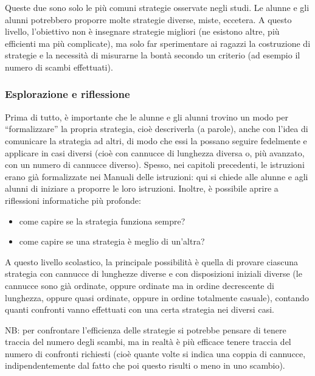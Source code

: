 Queste due sono solo le più comuni strategie osservate negli studi. Le alunne e gli alunni potrebbero proporre molte strategie diverse, miste, eccetera. A questo livello, l'obiettivo non è insegnare strategie migliori (ne esistono altre, più efficienti ma più complicate), ma solo far sperimentare ai ragazzi la costruzione di strategie e la necessità di misurarne la bontà secondo un criterio (ad esempio il numero di scambi effettuati).

\subsubsection{Esplorazione e riflessione}\label{esplorazione-e-riflessione}

Prima di tutto, è importante che le alunne e gli alunni trovino un modo per ``formalizzare'' la propria strategia, cioè descriverla (a parole), anche con l'idea di comunicare la strategia ad altri, di modo che essi la possano seguire fedelmente e applicare in casi diversi (cioè con cannucce di lunghezza diversa o, più avanzato, con un numero di cannucce diverso). Spesso, nei capitoli precedenti, le istruzioni erano già formalizzate nei Manuali delle istruzioni: qui si chiede alle alunne e agli alunni di iniziare a proporre le loro istruzioni. Inoltre, è possibile aprire a riflessioni informatiche più profonde:

\begin{itemize}
\item
  come capire se la strategia funziona sempre?
\item
  come capire se una strategia è meglio di un'altra?
\end{itemize}

A questo livello scolastico, la principale possibilità è quella di provare ciascuna strategia con cannucce di lunghezze diverse e con disposizioni iniziali diverse (le cannucce sono già ordinate, oppure ordinate ma in ordine decrescente di lunghezza, oppure quasi ordinate, oppure in ordine totalmente casuale), contando quanti confronti vanno effettuati con una certa strategia nei diversi casi.

\begin{attenzione}\label{aspetto-a-cui-fare-attenzione-7}


NB: per confrontare l'efficienza delle strategie si potrebbe pensare di tenere traccia del numero degli scambi, ma in realtà è più efficace tenere traccia del numero di confronti richiesti (cioè quante volte si indica una coppia di cannucce, indipendentemente dal fatto che poi questo risulti o meno in uno scambio).
\end{attenzione}


